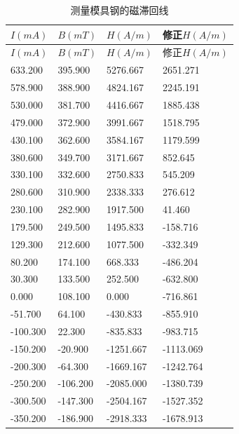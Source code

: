 \documentclass[zihao=5, UTF8]{article}
\theoremstyle{MyLineTheoremStyle} %
\theoremstyle{MyBlockTheoremStyle} %
\theoremstyle{MySubsubsectionStyle} %
\begin{document}

\begin{longtable}{|p{}|p{}|p{}|p{}|}
  \caption{测量模具钢的磁滞回线} \label{测量模具钢的磁滞回线} \\
  \hline
  $I(mA)$ & $B(mT)$ & $H(A/m)$ & 修正$H(A/m)$ \\
  \hline
  \endfirsthead

  \hline
  $I(mA)$ & $B(mT)$ & $H(A/m)$ & 修正$H(A/m)$ \\
  \hline
  \endhead

  \hline
  \endfoot

  633.200 & 395.900 & 5276.667 & 2651.271 \\
  \hline
  578.900 & 388.900 & 4824.167 & 2245.191 \\
  \hline
  530.000 & 381.700 & 4416.667 & 1885.438 \\
  \hline
  479.000 & 372.900 & 3991.667 & 1518.795 \\
  \hline
  430.100 & 362.600 & 3584.167 & 1179.599 \\
  \hline
  380.600 & 349.700 & 3171.667 & 852.645 \\
  \hline
  330.100 & 332.600 & 2750.833 & 545.209 \\
  \hline
  280.600 & 310.900 & 2338.333 & 276.612 \\
  \hline
  230.100 & 282.900 & 1917.500 & 41.460 \\
  \hline
  179.500 & 249.500 & 1495.833 & -158.716 \\
  \hline
  129.300 & 212.600 & 1077.500 & -332.349 \\
  \hline
  80.200  & 174.100 & 668.333  & -486.204 \\
  \hline
  30.300  & 133.500 & 252.500  & -632.800 \\
  \hline
  0.000   & 108.100 & 0.000    & -716.861 \\
  \hline
  -51.700 & 64.100  & -430.833 & -855.910 \\
  \hline
  -100.300 & 22.300  & -835.833 & -983.715 \\
  \hline
  -150.200 & -20.900 & -1251.667 & -1113.069 \\
  \hline
  -200.300 & -64.300 & -1669.167 & -1242.764 \\
  \hline
  -250.200 & -106.200 & -2085.000 & -1380.739 \\
  \hline
  -300.500 & -147.300 & -2504.167 & -1527.352 \\
  \hline
  -350.200 & -186.900 & -2918.333 & -1678.913 \\

\end{longtable}
\end{document}
